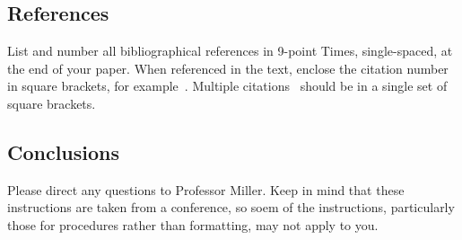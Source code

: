 \documentclass[10pt,twocolumn]{article}
\begin{document}
\subsection{References}

List and number all bibliographical references in 9-point Times,
single-spaced, at the end of your paper. When referenced in the text,
enclose the citation number in square brackets, for
example~\cite{ex1}.  Multiple citations~\cite{ex1,ex2} should be in a
single set of square brackets.

\subsection{Conclusions}

Please direct any questions to Professor Miller.  Keep in mind that
these instructions are taken from a conference, so soem of the
instructions, particularly those for procedures rather than
formatting, may not apply to you.



\end{document}
